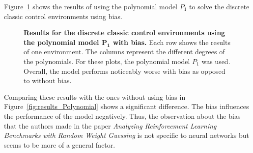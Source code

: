 Figure~\ref{fig:results_Polynomial_bias} shows the results of using the polynomial model $P_1$ to solve the discrete classic control environments using bias.
\begin{figure}[!ht]
\begin{figrow}
\item \label{row:Polynomial_CartPole_bias}  
\item \label{row:Polynomial_MountainCar_bias}  
\end{figrow}
\caption[Results for the discrete classic control environments using the polynomial model $\mathbf{P_1}$ with bias]{
  \textbf{Results for the discrete classic control environments using the polynomial model $\mathbf{P_1}$ with bias.}
   Each row shows the results of one environment. The columns represent the different degrees of the polynomials. For these plots, the polynomial model $P_1$ was used. Overall, the model performs noticeably worse with bias as opposed to without bias.
}
\label{fig:results_Polynomial_bias}
\end{figure}
Comparing these results with the ones without using bias in Figure~\ref{fig:results_Polynomial} shows a significant difference. The bias influences the performance of the model negatively. Thus, the observation about the bias that the authors made in the paper \emph{Analyzing Reinforcement Learning Benchmarks with Random Weight Guessing} is not specific to neural networks but seems to be more of a general factor.

